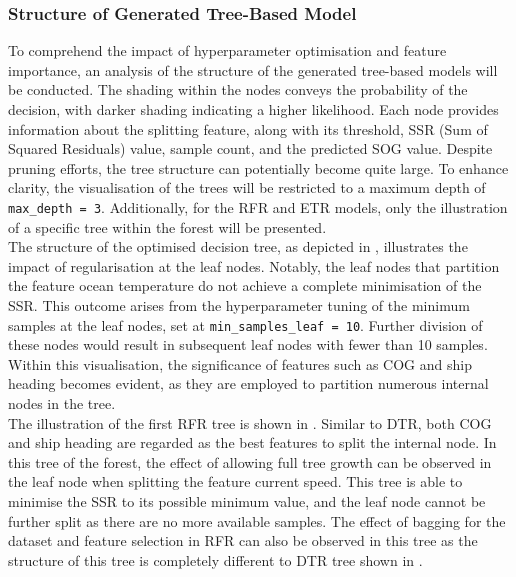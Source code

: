 \subsubsection*{Structure of Generated Tree-Based Model}


To comprehend the impact of hyperparameter optimisation and feature importance, an analysis of the structure of the generated tree-based models will be conducted. The shading within the nodes conveys the probability of the decision, with darker shading indicating a higher likelihood. Each node provides information about the splitting feature, along with its threshold, SSR (Sum of Squared Residuals) value, sample count, and the predicted SOG value. Despite pruning efforts, the tree structure can potentially become quite large. To enhance clarity, the visualisation of the trees will be restricted to a maximum depth of {\tt max\_depth = 3}. Additionally, for the RFR and ETR models, only the illustration of a specific tree within the forest will be presented.\\

The structure of the optimised decision tree, as depicted in , illustrates the impact of regularisation at the leaf nodes. Notably, the leaf nodes that partition the feature ocean temperature do not achieve a complete minimisation of the SSR. This outcome arises from the hyperparameter tuning of the minimum samples at the leaf nodes, set at {\tt min\_samples\_leaf = 10}. Further division of these nodes would result in subsequent leaf nodes with fewer than 10 samples. Within this visualisation, the significance of features such as COG and ship heading becomes evident, as they are employed to partition numerous internal nodes in the tree.\\


The illustration of the first RFR tree is shown in . Similar to DTR, both COG and ship heading are regarded as the best features to split the internal node. In this tree of the forest, the effect of allowing full tree growth can be observed in the leaf node when splitting the feature current speed. This tree is able to minimise the SSR to its possible minimum value, and the leaf node cannot be further split as there are no more available samples. The effect of bagging for the dataset and feature selection in RFR can also be observed in this tree as the structure of this tree is completely different to DTR tree shown in .\\

